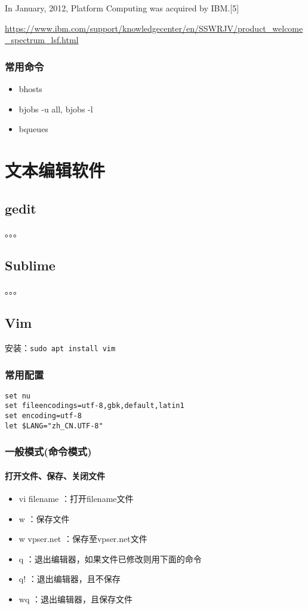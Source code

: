 {In January, 2012, Platform Computing was acquired by IBM.[5]


\url{https://www.ibm.com/support/knowledgecenter/en/SSWRJV/product_welcome_spectrum_lsf.html}



\subsubsection{常用命令}
\begin{itemize}
\item bhosts
\item bjobs -u all, bjobs -l
\item bqueues
\end{itemize}






\section{文本编辑软件}
\subsection{gedit}
。。。


\subsection{Sublime}
。。。

\subsection{Vim}
安装：\verb|sudo apt install vim|

\subsubsection{常用配置}
\begin{verbatim}
set nu
set fileencodings=utf-8,gbk,default,latin1
set encoding=utf-8
let $LANG="zh_CN.UTF-8"
\end{verbatim}


\subsubsection{一般模式(命令模式)}
\paragraph{打开文件、保存、关闭文件}
\begin{itemize}
\item vi filename ：打开filename文件
\item w ：保存文件
\item w vpser.net ：保存至vpser.net文件
\item q ：退出编辑器，如果文件已修改则用下面的命令
\item q! ：退出编辑器，且不保存
\item wq ：退出编辑器，且保存文件
\end{itemize}


}
